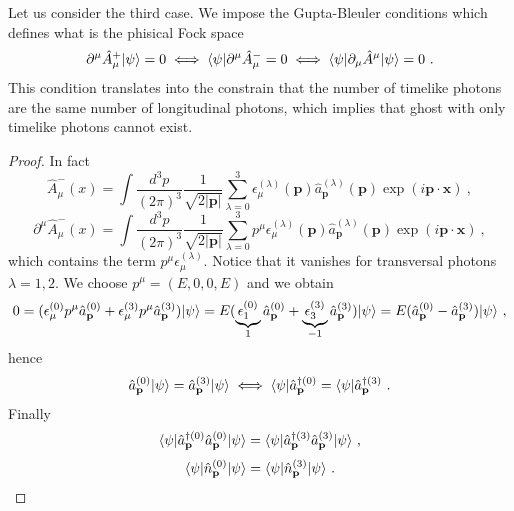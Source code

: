     Let us consider the third case. We impose the Gupta-Bleuler conditions which defines what is the phisical Fock space
    \begin{equation}\label{GB}
        \partial^\mu \hat A^+_\mu \vert\psi\rangle = 0 \iff \langle\psi\vert \partial^\mu \hat A^-_\mu = 0 \iff \langle\psi\vert \partial_\mu \hat A^\mu \vert\psi\rangle = 0~.
    \end{equation}
    This condition translates into the constrain that the number of timelike photons are the same number of longitudinal photons, which implies that ghost with only timelike photons cannot exist.
    \begin{proof}
        In fact 
        \begin{equation*}
            \hat A^-_\mu (x) = \int \frac{d^3 p}{(2\pi)^3} \frac{1}{\sqrt{2 |\mathbf p|}} \sum_{\lambda=0}^{3} \epsilon_\mu^{(\lambda)} (\mathbf p) \hat a_{\mathbf p}^{(\lambda)} (\mathbf p) \exp(i \mathbf p \cdot \mathbf x) ~,
        \end{equation*}
        \begin{equation*}
            \partial^\mu \hat A^-_\mu (x) = \int \frac{d^3 p}{(2\pi)^3} \frac{1}{\sqrt{2 |\mathbf p|}} \sum_{\lambda=0}^{3} p^\mu \epsilon_\mu^{(\lambda)} (\mathbf p) \hat a_{\mathbf p}^{(\lambda)} (\mathbf p) \exp(i \mathbf p \cdot \mathbf x) ~,
        \end{equation*}
        which contains the term $p^\mu \epsilon_\mu^{(\lambda)}$. Notice that it vanishes for transversal photons $\lambda = 1,2$. We choose $p^\mu = (E, 0, 0, E)$ and we obtain 
        \begin{equation*}
            0 = (\epsilon^{(0)}_\mu p^\mu \hat a^{(0)}_{\mathbf p} + \epsilon^{(3)}_\mu p^\mu \hat a^{(3)}_{\mathbf p}) \vert\psi\rangle = E (\underbrace{\epsilon^{(0)}_1}_1 \hat a^{(0)}_{\mathbf p} + \underbrace{\epsilon^{(3)}_3}_{-1} \hat a^{(3)}_{\mathbf p}) \vert\psi\rangle = E (\hat a^{(0)}_{\mathbf p} - \hat a^{(3)}_{\mathbf p}) \vert\psi\rangle ~,
        \end{equation*}
        hence 
        \begin{equation*}
            \hat a^{(0)}_{\mathbf p} \vert\psi \rangle = \hat a^{(3)}_{\mathbf p} \vert\psi\rangle \iff \langle\psi\vert \hat a^{\dagger(0)}_{\mathbf p} = \langle\psi\vert \hat a^{\dagger(3)}_{\mathbf p}  ~.
        \end{equation*}
        Finally 
        \begin{equation*}
            \langle\psi\vert \hat a^{\dagger(0)}_{\mathbf p} \hat a^{(0)}_{\mathbf p} \vert\psi\rangle = \langle\psi\vert \hat a^{\dagger(3)}_{\mathbf p} \hat a^{(3)}_{\mathbf p} \vert\psi\rangle ~,
        \end{equation*}
        \begin{equation*}
            \langle\psi\vert \hat n^{(0)}_{\mathbf p} \vert\psi\rangle = \langle\psi\vert \hat n^{(3)}_{\mathbf p} \vert\psi\rangle ~.
        \end{equation*}
    \end{proof}

